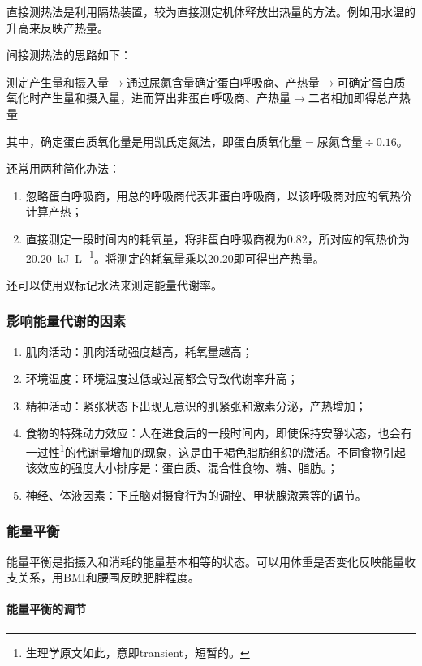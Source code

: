 直接测热法是利用隔热装置，较为直接测定机体释放出热量的方法。例如用水温的升高来反映产热量。

间接测热法的思路如下：

测定产生量和摄入量$\longrightarrow$通过尿氮含量确定蛋白呼吸商、产热量$\longrightarrow$可确定蛋白质氧化时产生量和摄入量，进而算出非蛋白呼吸商、产热量$\longrightarrow$二者相加即得总产热量

其中，确定蛋白质氧化量是用凯氏定氮法，即$\text{蛋白质氧化量}=\text{尿氮含量}\div 0.16$。

还常用两种简化办法：
\begin{enumerate}
	\item 忽略蛋白呼吸商，用总的呼吸商代表非蛋白呼吸商，以该呼吸商对应的氧热价计算产热；
	\item 直接测定一段时间内的耗氧量，将非蛋白呼吸商视为0.82，所对应的氧热价为\SI{20.20}{\kJ\per\L}。将测定的耗氧量乘以20.20即可得出产热量。
\end{enumerate}

还可以使用双标记水法来测定能量代谢率。

\subsubsection{影响能量代谢的因素}

\begin{enumerate}
	\item 肌肉活动：肌肉活动强度越高，耗氧量越高；
	\item 环境温度：环境温度过低或过高都会导致代谢率升高；
	\item 精神活动：紧张状态下出现无意识的肌紧张和激素分泌，产热增加；
	\item 食物的特殊动力效应：人在进食后的一段时间内，即使保持安静状态，也会有一过性\footnote{生理学原文如此，意即transient，短暂的。}的代谢量增加的现象，这是由于褐色脂肪组织的激活。不同食物引起该效应的强度大小排序是：蛋白质、混合性食物、糖、脂肪。；
	\item 神经、体液因素：下丘脑对摄食行为的调控、甲状腺激素等的调节。
\end{enumerate}

\subsubsection{能量平衡}

能量平衡是指摄入和消耗的能量基本相等的状态。可以用体重是否变化反映能量收支关系，用BMI和腰围反映肥胖程度。

\paragraph{能量平衡的调节}

